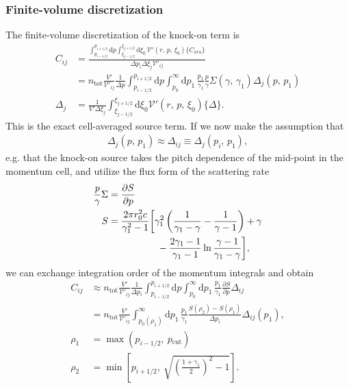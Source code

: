 \documentclass[11pt,a4paper]{article}
\newcommand{\rd}{\ensuremath{\mathrm{d}}}
\newcommand{\sub}[1]{\ensuremath{_{\text{#1}}}}
\begin{document}
\subsubsection{Finite-volume discretization}
The finite-volume discretization of the knock-on term is
\begin{align}
C_{ij} &= \frac{\int_{p_{i-1/2}}^{p_{i+1/2}}\rd p \int_{\xi_{j-1/2}}^{\xi_{j+1/2}}\rd\xi_0\,\mathcal{V}'(r,\,p,\,\xi_0)\{C\sub{ava}\}}{\Delta p_i \Delta \xi_j \mathcal{V}'_{ij}} \nonumber \\
&= n\sub{tot}\frac{V'}{\mathcal{V}'_{ij}}\frac{1}{\Delta p}\int_{p_{i-1/2}}^{p_{i+1/2}}\rd p \int_{p_0}^\infty\rd p_1\,\frac{p_1}{\gamma_1}\frac{p}{\gamma}\Sigma(\gamma,\,\gamma_1)\Delta_j(p,\,p_1) \nonumber \\ 
\Delta_j &= \frac{1}{V' \Delta \xi_j}\int_{\xi_{j-1/2}}^{\xi_{j+1/2}}\rd \xi_0 \mathcal{V}'(r,\,p,\,\xi_0)\{\Delta\}.
\end{align}
This is the exact cell-averaged source term. If we now make the assumption that
\begin{align}
\Delta_j(p,\,p_1) \approx \Delta_{ij} \equiv \Delta_j(p_i,\,p_1),
\end{align}
e.g. that the knock-on source takes the pitch dependence of the mid-point in the momentum cell, and utilize the flux form of the scattering rate
\begin{align}
\frac{p}{\gamma}\Sigma &= \frac{\partial S}{\partial p} \\
S &=  \frac{2\pi r_0^2 c}{\gamma_1^2-1}\biggl[ \gamma_1^2\left(\frac{1}{\gamma_1-\gamma} - \frac{1}{\gamma-1}\right) 
+ \gamma \nonumber \\
&\hspace{18mm} - \frac{2\gamma_1 - 1}{\gamma_1-1}\ln\frac{\gamma-1}{\gamma_1-\gamma} \biggr],
\end{align}
we can exchange integration order of the momentum integrals and obtain
\begin{align}
C_{ij} &\approx n\sub{tot}\frac{V'}{\mathcal{V}'_{ij}}\frac{1}{\Delta p_i}\int_{p_{i-1/2}}^{p_{i+1/2}}\rd p \int_{p_0}^\infty\rd p_1\,\frac{p_1}{\gamma_1}\frac{\partial S}{\partial p}\Delta_{ij}
\nonumber \\
&= n\sub{tot}\frac{V'}{\mathcal{V}'_{ij}}\int_{p_0(\rho_1)}^\infty \rd p_1 \, \frac{p_1}{\gamma_1}\frac{S(\rho_2) - S(\rho_1)}{\Delta p_i}\Delta_{ij}(p_1), \nonumber \\
\rho_1 &= \max\left(p_{i-1/2}, ~p\sub{cut}\right) \\
\rho_2 &= \min\left[p_{i+1/2}, ~ \sqrt{ \left(\frac{1+\gamma_1}{2} \right)^2 - 1} \right].
\end{align}
\end{document}
